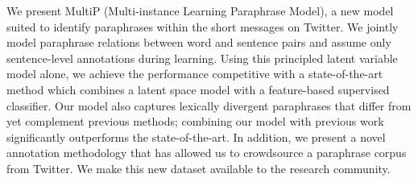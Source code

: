We present MultiP (Multi-instance Learning Paraphrase Model), a new model suited to identify paraphrases within the short messages on Twitter. We jointly model paraphrase relations between word and sentence pairs and assume only sentence-level annotations during learning. Using this principled latent variable model alone, we achieve the performance competitive with a state-of-the-art method which combines a latent space model with a feature-based supervised classifier. Our model also captures lexically divergent paraphrases that differ from yet complement previous methods; combining our model with previous work significantly outperforms the state-of-the-art. In addition, we present a novel annotation methodology that has allowed us to crowdsource a paraphrase corpus from Twitter. We make this new dataset available to the research community.